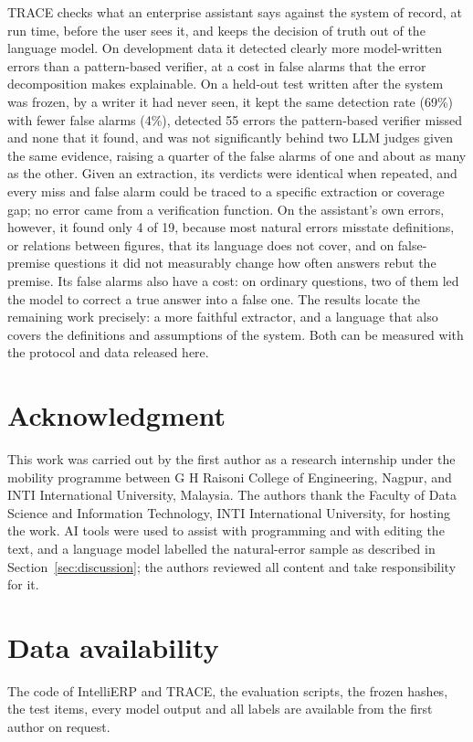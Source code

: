 \documentclass[journal]{IEEEtran}
\begin{document}
TRACE checks what an enterprise assistant says against the system of record, at run time, before the user
sees it, and keeps the decision of truth out of the language model. On development data it detected
clearly more model-written errors than a pattern-based verifier, at a cost in false alarms that the error
decomposition makes explainable. On a held-out test written after the system was frozen, by a writer it
had never seen, it kept the same detection rate (69\%) with fewer false alarms (4\%), detected 55 errors the
pattern-based verifier missed and none that it found, and was not significantly behind two LLM judges given
the same evidence, raising a quarter of the false alarms of one and about as many as the other. Given an extraction, its verdicts were identical when
repeated, and every miss and false alarm could be traced to a specific extraction or coverage gap; no error
came from a verification function. On the assistant's own errors, however, it found only 4 of 19, because
most natural errors misstate definitions, or relations between figures, that its language does not cover, and on false-premise questions
it did not measurably change how often answers rebut the premise. Its false alarms also have a cost: on
ordinary questions, two of them led the model to correct a true answer into a false one. The results locate the remaining work
precisely: a more faithful extractor, and a language that also covers the definitions and assumptions of
the system. Both can be measured with the protocol and data released here.

\section*{Acknowledgment}
This work was carried out by the first author as a research internship under the mobility programme between G H Raisoni
College of Engineering, Nagpur, and INTI International University, Malaysia. The authors thank the Faculty of Data Science and Information Technology, INTI International University, for
hosting the work. AI tools were used to assist with programming and with editing the text, and a language model labelled
the natural-error sample as described in Section~\ref{sec:discussion}; the authors reviewed all content and take
responsibility for it.

\section*{Data availability}
The code of IntelliERP and TRACE, the evaluation scripts, the frozen hashes, the test items, every model
output and all labels are available from the first author on request.



\end{document}
